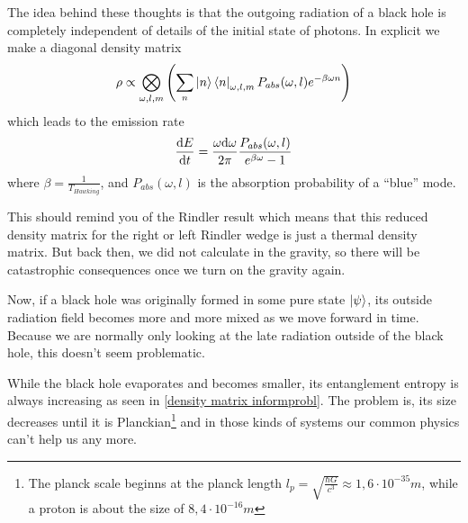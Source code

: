 	The idea behind these thoughts is that the outgoing radiation of a black hole is completely independent of details of the initial state of photons. 
	In explicit we make a diagonal density matrix
		\begin{equation} \label{density matrix informprobl}
			\rho \propto \bigotimes_{\omega, l, m} \left(
			\sum_n \ket{n} \bra{n}_{\omega, l, m} P_{abs} (\omega, l) e^{-\beta \omega n}
			\right)
		\end{equation}
	which leads to the emission rate 
		\begin{equation}
			\frac{\mathrm{d} E}{\mathrm{d} t} = 
			\frac{\omega \mathrm{d} \omega}{2\pi} 
			\frac{P_{abs}(\omega, l)}{e^{\beta \omega}-1}
		\end{equation}
	where $\beta = \frac{1}{T_{Hawking}}$, and $P_{abs}(\omega, l)$ is the absorption
	probability of a ``blue'' mode.
		
	This should remind you of the Rindler result which means that this reduced density matrix for the right or left Rindler wedge is just a thermal density matrix. But back then, we did not calculate in the gravity, so there will be catastrophic consequences once we turn on the gravity again.
		
	Now, if a black hole was originally formed in some pure state $\ket{\psi}$, its outside radiation field becomes more and more mixed as we move forward in time. Because we are normally only looking at the late radiation outside of the black hole, this doesn't seem problematic. 
		
	While the black hole evaporates and becomes smaller, its entanglement entropy is always increasing as seen in \eqref{density matrix informprobl}. The problem is, its size decreases until it is Planckian\footnote{The planck scale beginns at the planck length $l_p = \sqrt{\frac{\hbar G}{c^3}} \approx 1,6 \cdot 10^{-35}m$, while a proton is about the size of $8,4 \cdot 10^{-16}m$} and in those kinds of systems our common physics can't help us any more.
	
